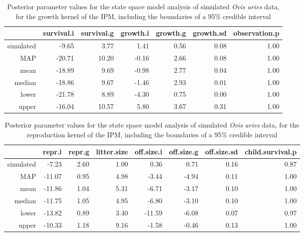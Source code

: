 \documentclass[a4paper,12pt]{article}
\begin{document}
\begin{table}[ht]
\centering
\begin{tabular}{rrrrrrr}
  \hline
 & survival.i & survival.g & growth.i & growth.g & growth.sd & observation.p \\ 
  \hline
simulated & -9.65 & 3.77 & 1.41 & 0.56 & 0.08 & 1.00 \\ 
  MAP & -20.71 & 10.20 & -0.16 & 2.66 & 0.08 & 1.00 \\ 
  mean & -18.89 & 9.69 & -0.98 & 2.77 & 0.04 & 1.00 \\ 
  median & -18.86 & 9.67 & -1.46 & 2.93 & 0.01 & 1.00 \\ 
  lower & -21.78 & 8.89 & -4.30 & 0.75 & 0.00 & 1.00 \\ 
  upper & -16.04 & 10.57 & 5.80 & 3.67 & 0.31 & 1.00 \\ 
   \hline
\end{tabular}
\caption{\label{post1} Posterior parameter values for the state space model analysis of simulated \textit{Ovis aries} data, for the growth kernel of the IPM, including the boundaries of a 95\% credible interval}
\end{table}

\begin{table}[ht]
\centering
\begin{tabular}{rrrrrrrr}
  \hline
 & repr.i & repr.g & litter.size & off.size.i & off.size.g & off.size.sd & child.survival.p \\ 
  \hline
simulated & -7.23 & 2.60 & 1.00 & 0.36 & 0.71 & 0.16 & 0.87 \\ 
  MAP & -11.07 & 0.95 & 4.98 & -3.44 & -4.94 & 0.11 & 1.00 \\ 
  mean & -11.86 & 1.04 & 5.31 & -6.71 & -3.17 & 0.10 & 1.00 \\ 
  median & -11.75 & 1.05 & 4.95 & -6.80 & -3.10 & 0.10 & 1.00 \\ 
  lower & -13.82 & 0.89 & 3.40 & -11.59 & -6.08 & 0.07 & 0.97 \\ 
  upper & -10.33 & 1.18 & 9.16 & -1.58 & -0.46 & 0.13 & 1.00 \\ 
   \hline
\end{tabular}
\caption{\label{post2} Posterior parameter values for the state space model analysis of simulated \textit{Ovis aries} data, for the reproduction kernel of the IPM, including the boundaries of a 95\% credible interval}
\end{table}
\end{document}
